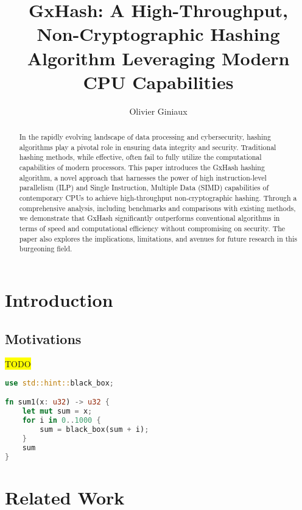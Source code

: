 \documentclass[10pt]{article}
\title{GxHash: A High-Throughput, Non-Cryptographic Hashing Algorithm Leveraging Modern CPU Capabilities}
\author{Olivier Giniaux}
\date{}
\begin{document}
\maketitle

\begin{abstract}

In the rapidly evolving landscape of data processing and cybersecurity, hashing algorithms play a pivotal role in ensuring data integrity and security.
Traditional hashing methods, while effective, often fail to fully utilize the computational capabilities of modern processors.
This paper introduces the GxHash hashing algorithm, a novel approach that harnesses the power of high instruction-level parallelism (ILP) and Single
Instruction, Multiple Data (SIMD) capabilities of contemporary CPUs to achieve high-throughput non-cryptographic hashing. Through a comprehensive
analysis, including benchmarks and comparisons with existing methods, we demonstrate that GxHash significantly outperforms conventional algorithms
in terms of speed and computational efficiency without compromising on security. The paper also explores the implications, limitations, and avenues
for future research in this burgeoning field.

\end{abstract}

\begin{multicols}{2}
\tableofcontents
\end{multicols}

\clearpage
\section{Introduction}

\subsection{Motivations}

\colorbox{yellow}{TODO}

\begin{lstlisting}[language=Rust, style=boxed]
use std::hint::black_box;

fn sum1(x: u32) -> u32 {
    let mut sum = x;
    for i in 0..1000 {
        sum = black_box(sum + i);
    }
    sum
}
\end{lstlisting}

\section{Related Work}
\end{document}

